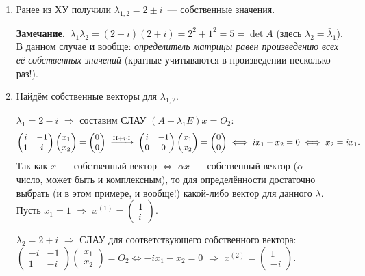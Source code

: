 \documentclass[a4paper,11pt]{article}
\newcommand{\zam}{\textbf{Замечание.}\ }
\newcommand{\gauss}[2][]{\;\xrightarrow[\scriptstyle #1]{\scriptstyle #2}\;}
\begin{document}
\begin{enumerate}[label=\arabic*.]
\item Ранее из ХУ получили $\lambda_{1,2}=2\pm i$~--- собственные значения.

\zam $\lambda_1\lambda_2=(2-i)(2+i)=2^2+1^2=5=\det A$ (здесь $\lambda_2=\bar\lambda_1$).
В данном случае и вообще: \emph{определитель матрицы равен произведению всех её собственных
значений} (кратные учитываются в произведении несколько раз!).
\item Найдём собственные векторы для $\lambda_{1,2}$.

$\lambda_1=2-i$ $\Rightarrow$ составим СЛАУ $(A-\lambda_1E)x=O_2$:
\[
\begin{pmatrix}i&-1\\1&i\end{pmatrix}\begin{pmatrix}x_1\\x_2\end{pmatrix}=\begin{pmatrix}0\\0\end{pmatrix}
\gauss{\text{II}+i\cdot\text{I}}
\begin{pmatrix}i&-1\\0&0\end{pmatrix}\begin{pmatrix}x_1\\x_2\end{pmatrix}=\begin{pmatrix}0\\0\end{pmatrix}
\iff ix_1-x_2=0\iff x_2=ix_1.
\]
Так как $x$~--- собственный вектор $\iff$ $\alpha x$~--- собственный вектор ($\alpha$~--- число, может
быть и комплексным), то для определённости достаточно выбрать (и в этом примере, и вообще!)
какой-либо вектор для данного $\lambda$. Пусть $x_1=1$ $\Rightarrow$
$x^{(1)}=\begin{pmatrix}1\\i\end{pmatrix}$.

$\lambda_2=2+i$ $\Rightarrow$ СЛАУ для соответствующего собственного вектора:
$\begin{pmatrix}-i&-1\\1&-i\end{pmatrix}\begin{pmatrix}x_1\\x_2\end{pmatrix}=O_2\iff-ix_1-x_2=0$
$\Rightarrow$ $x^{(2)}=\begin{pmatrix}1\\-i\end{pmatrix}$.
\end{enumerate}
\end{document}

